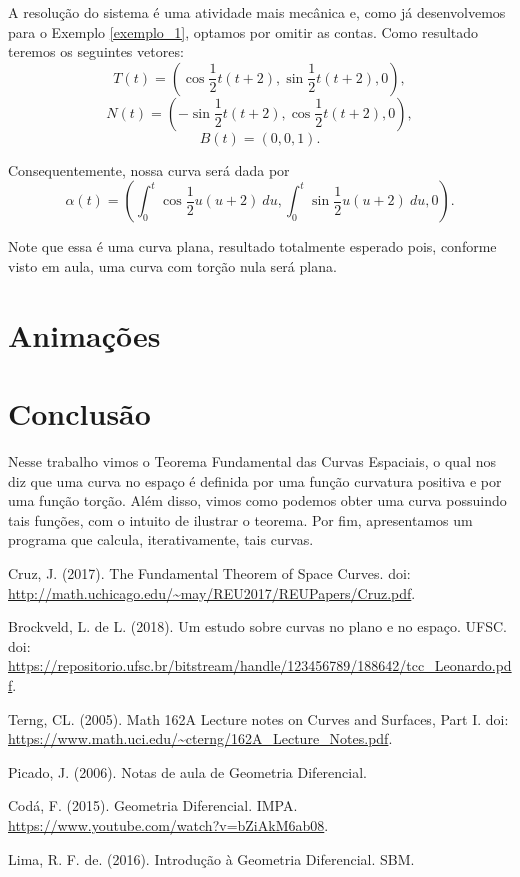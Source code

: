\documentclass{article}
\begin{document}
A resolução do sistema é uma atividade mais mecânica e, como já desenvolvemos para o Exemplo \ref{exemplo_1}, optamos por omitir as contas. Como resultado teremos os seguintes vetores:
\[T(t) = \left(\cos{\dfrac{1}{2}t(t + 2)}, \sin{\dfrac{1}{2}t(t + 2)}, 0\right),\]
\[N(t) = \left(-\sin{\dfrac{1}{2}t(t + 2)}, \cos{\dfrac{1}{2}t(t + 2)}, 0\right),\]
\[B(t) = \left(0, 0, 1\right).\]

Consequentemente, nossa curva será dada por
\[\alpha(t) = \left(\int_0^t \cos{\dfrac{1}{2}u(u + 2)} ~du, \int_0^t \sin{\dfrac{1}{2}u(u + 2)} ~du, 0\right).\]

Note que essa é uma curva plana, resultado totalmente esperado pois, conforme visto em aula, uma curva com torção nula será plana.

\section{Animações}







\section{Conclusão}

Nesse trabalho vimos o Teorema Fundamental das Curvas Espaciais, o qual nos diz que uma curva no espaço é definida por uma função curvatura positiva e por uma função torção. Além disso, vimos como podemos obter uma curva possuindo tais funções, com o intuito de ilustrar o teorema. Por fim, apresentamos um programa que calcula, iterativamente, tais curvas.

\begin{thebibliography}{9}

 Cruz, J. (2017). The Fundamental Theorem of Space Curves. doi: \url{http://math.uchicago.edu/~may/REU2017/REUPapers/Cruz.pdf}.

 Brockveld, L. de L. (2018). Um estudo sobre curvas no plano e no espaço. UFSC. doi: \url{https://repositorio.ufsc.br/bitstream/handle/123456789/188642/tcc_Leonardo.pdf}.

 Terng, CL. (2005). Math 162A Lecture notes on Curves and Surfaces, Part I. doi: \url{https://www.math.uci.edu/~cterng/162A_Lecture_Notes.pdf}.

 Picado, J. (2006). Notas de aula de Geometria Diferencial.

 Codá, F. (2015). Geometria Diferencial. IMPA. \url{https://www.youtube.com/watch?v=bZiAkM6ab08}.

 Lima, R. F. de. (2016). Introdução à Geometria Diferencial. SBM.

\end{thebibliography}
\end{document}
